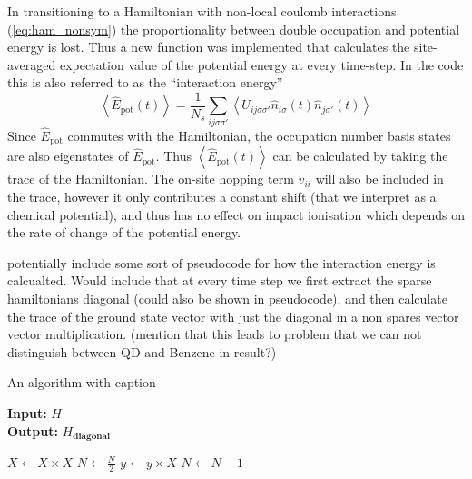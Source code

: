 In transitioning to a Hamiltonian with non-local coulomb interactions (\ref{eq:ham_nonsym}) the proportionality between double occupation and potential energy is lost. Thus a new function was implemented that calculates the site-averaged expectation value of the potential energy at every time-step. In the code this is also referred to as the ``interaction energy''
\begin{equation}
    \left\langle{\hat{E}_{\text{pot}}(t)}\right\rangle = \frac{1}{N_s} \sum_{ij\sigma\sigma'} \left\langle{U_{ij\sigma\sigma'}\hat{n}_{i \sigma}(t) \hat{n}_{j\sigma'}(t)}\right\rangle
\end{equation}
Since $\hat{E}_{\text{pot}}$ commutes with the Hamiltonian, the occupation number basis states are also eigenstates of $\hat{E}_{\text{pot}}$. Thus $\left\langle{\hat{E}_{\text{pot}}(t)}\right\rangle$ can be calculated by taking the trace of the Hamiltonian. The on-site hopping term $v_{ii}$ will also be included in the trace, however it only contributes a constant shift (that we interpret as a chemical potential), and thus has no effect on impact ionisation which depends on the rate of change of the potential energy.

\color{red}
potentially include some sort of pseudocode for how the interaction energy is calcualted. Would include that at every time step we first extract the sparse hamiltonians diagonal (could also be shown in pseudocode), and then calculate the trace of the ground state vector with just the diagonal in a non spares vector vector multiplication. (mention that this leads to problem that we can not distinguish between QD and Benzene in result?)
\color{black}

\begin{algorithm}
\caption{An algorithm with caption}\label{alg:cap}
\hspace*{\algorithmicindent} \textbf{Input:} $H$ \\
\hspace*{\algorithmicindent} \textbf{Output:} $H_{\textbf{diagonal}}$
\begin{algorithmic}[1]
 
    \State
    \State
\EndFor
{}
    \State $X \gets X \times X$
    \State $N \gets \frac{N}{2}$  
    \State $y \gets y \times X$
    \State $N \gets N - 1$
\EndIf
\EndWhile
\end{algorithmic}
\end{algorithm}